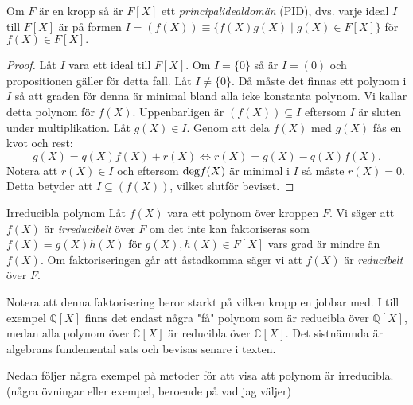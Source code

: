 \documentclass{article}
\newcommand{\grad}[0]{\textnormal{deg}}
\theoremstyle{definition}
\begin{document}
\hypertarget{pid}{}
\begin{myprop}{}{}
  Om $F$ är en kropp så är $F[X]$ ett \textit{principalidealdomän} (PID), dvs. varje ideal $I$ till $F[X]$ är på formen 
  $I = (f(X)) \equiv \{f(X)g(X) \; | \; g(X) \in F[X]\}$ för $f(X) \in F[X].$
\end{myprop}
\begin{proof}
  Låt $I$ vara ett ideal till $F[X]$. Om $I = \{0\}$ så är $I = (0)$ och propositionen gäller för detta fall. Låt $I \neq \{0\}$.
  Då måste det finnas ett polynom i $I$ så att graden för denna är minimal bland alla icke konstanta polynom. Vi kallar detta polynom 
  för $f(X).$ Uppenbarligen är $(f(X)) \subseteq I$ eftersom $I$ är sluten under multiplikation. Låt $g(X) \in I$. 
  Genom att dela $f(X)$ med $g(X)$ fås en kvot och rest: 
  \[g(X) = q(X)f(X) + r(X) \iff r(X) = g(X) - q(X)f(X).\]
  Notera att $r(X) \in I$ och eftersom $\grad f(X)$ är minimal i $I$ så måste $r(X) = 0.$ Detta betyder att $I \subseteq (f(X))$, vilket 
  slutför beviset.
\end{proof}

\begin{mydef}{Irreducibla polynom}{}
  Låt $f(X)$ vara ett polynom över kroppen $F$. Vi säger att $f(X)$ är \textit{irreducibelt} över $F$ om det inte kan faktoriseras som $f(X) = g(X)h(X)$
  för $g(X), h(X) \in F[X]$ vars grad är mindre än $f(X)$. Om faktoriseringen går att åstadkomma säger vi att $f(X)$ är \textit{reducibelt} över $F.$
\end{mydef}
Notera att denna faktorisering beror starkt på vilken kropp en jobbar med. I till exempel $\mathbb{Q}[X]$ finns det endast några "få" polynom som är reducibla
över $\mathbb{Q}[X]$, medan alla polynom över $\mathbb{C}[X]$ är reducibla över $\mathbb{C}[X]$. Det sistnämnda är algebrans fundemental sats och 
bevisas senare i texten.

Nedan följer några exempel på metoder för att visa att polynom är irreducibla. 
(några övningar eller exempel, beroende på vad jag väljer)
\end{document}
